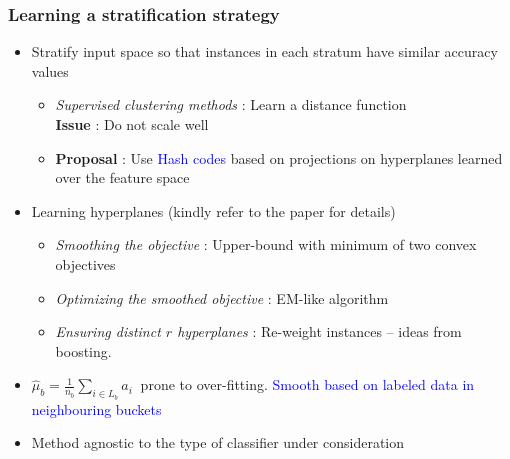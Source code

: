 \documentclass[11pt]{beamer}
\newcommand{\acc}{{a}}
\newcommand{\estSb}{{\mbox{$\hat{\mu}$}}}
\newlength{\wideitemsep}
\let\olditem\item
\renewcommand{\item}{\setlength{\itemsep}{\wideitemsep}\olditem}
\begin{document}
\begin{frame}
\frametitle{Learning a stratification strategy} %
\begin{itemize}
\pause
\item Stratify input space so that instances in each stratum have similar accuracy values
\pause
\begin{itemize}
\item \emph{Supervised clustering methods} : Learn a distance function \\ \textbf{Issue} : Do not scale well 
\item \textbf{Proposal} : Use \textcolor{blue}{Hash codes} based on projections on hyperplanes learned over the feature space
\end{itemize}
\pause
\item Learning hyperplanes (kindly refer to the paper for details)
\begin{itemize}
\item \emph{Smoothing the objective} : Upper-bound with minimum of two convex objectives
\item \emph{Optimizing the smoothed objective} : EM-like algorithm
\item \emph{Ensuring distinct $r$ hyperplanes} : Re-weight instances -- ideas from boosting. 
\end{itemize}
\pause
\item $\estSb_b=\frac{1}{n_b}\sum_{i\in L_b}\acc_i~$ prone to over-fitting. \textcolor{blue}{Smooth based on labeled data in neighbouring buckets}
\pause
\item Method agnostic to the type of classifier under consideration
\end{itemize}
\end{frame}
\end{document}
